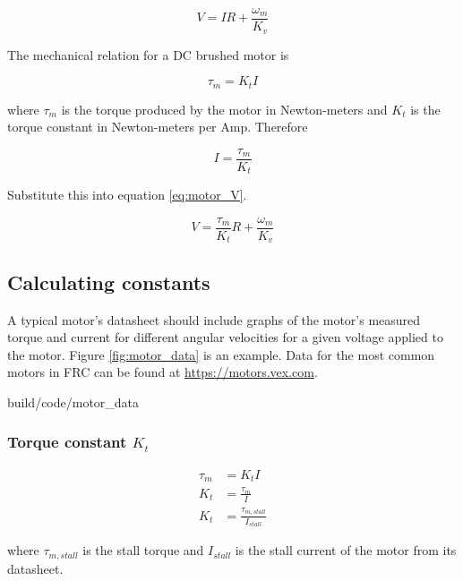 \begin{equation}
  V = IR + \frac{\omega_m}{K_v} \label{eq:motor_V}
\end{equation}

The mechanical relation for a DC brushed motor is

\begin{equation}
  \tau_m = K_t I \label{eq:motor_tau_m}
\end{equation}

where $\tau_m$ is the torque produced by the motor in Newton-meters and $K_t$ is
the torque constant in Newton-meters per Amp. Therefore

\begin{equation*}
  I = \frac{\tau_m}{K_t}
\end{equation*}

Substitute this into equation \eqref{eq:motor_V}.

\begin{equation}
  V = \frac{\tau_m}{K_t} R + \frac{\omega_m}{K_v} \label{eq:motor_tau_V}
\end{equation}

\subsection{Calculating constants}

A typical motor's datasheet should include graphs of the motor's measured torque
and current for different angular velocities for a given voltage applied to the
motor. Figure \ref{fig:motor_data} is an example. Data for the most common
motors in FRC can be found at \url{https://motors.vex.com}.

\begin{svg}{build/code/motor_data}
  \caption{Example motor datasheet for 775pro}
  \label{fig:motor_data}
\end{svg}

\subsubsection{Torque constant $K_t$}

\begin{align}
  \tau_m &= K_t I \nonumber \\
  K_t &= \frac{\tau_m}{I} \nonumber \\
  K_t &= \frac{\tau_{m,stall}}{I_{stall}}
\end{align}

where $\tau_{m,stall}$ is the stall torque and $I_{stall}$ is the stall current
of the motor from its datasheet.

